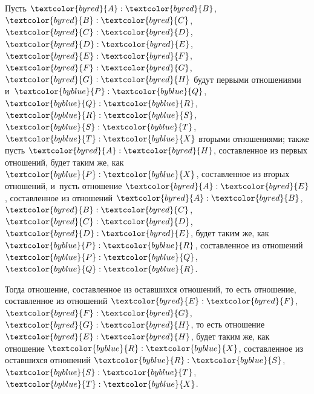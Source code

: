 \documentclass[letters,booklanguage=russian]{byrnebook}
\begin{document}
\vfill\pagebreak

\label{prop:V.H}
\def\varA{\textcolor{byred}{A}}
\def\varB{\textcolor{byred}{B}}
\def\varC{\textcolor{byred}{C}}
\def\varD{\textcolor{byred}{D}}
\def\varE{\textcolor{byred}{E}}
\def\varF{\textcolor{byred}{F}}
\def\varG{\textcolor{byred}{G}}
\def\varH{\textcolor{byred}{H}}
\def\varP{\textcolor{byblue}{P}}
\def\varQ{\textcolor{byblue}{Q}}
\def\varR{\textcolor{byblue}{R}}
\def\varS{\textcolor{byblue}{S}}
\def\varT{\textcolor{byblue}{T}}
\def\varX{\textcolor{byblue}{X}}

\marginpar{
~\hfill\fbox{\parbox{0.5\marginparwidth}{\centering
~$\varA\ \varB\ \varC\ \varD\ \varE\ \varF\ \varG\ \varH$~\\
~$\varP\ \varQ\ \varR\ \varS\ \varT\ \varX$~\\
}}\hfill~}
Пусть $\varA : \varB$, $\varB : \varC$, $\varC : \varD$, $\varD : \varE$, $\varE : \varF$, $\varF : \varG$, $\varG : \varH$ будут первыми отношениями и~$\varP : \varQ$, $\varQ : \varR$, $\varR : \varS$, $\varS : \varT$, $\varT : \varX$ вторыми отношениями; также пусть $\varA : \varH$, составленное из первых отношений, будет таким же, как $\varP : \varX$, составленное из вторых отношений, и~пусть отношение $\varA : \varE$, составленное из отношений $\varA : \varB$, $\varB : \varC$, $\varC : \varD$, $\varD : \varE$, будет таким же, как $\varP : \varR$, составленное из отношений $\varP : \varQ$, $\varQ : \varR$.

Тогда отношение, составленное из оставшихся отношений, то есть отношение, составленное из отношений $\varE : \varF$, $\varF : \varG$, $\varG : \varH$, то есть отношение $\varE : \varH$, будет таким же, как отношение $\varR : \varX$, составленное из оставшихся отношений $\varR : \varS$, $\varS : \varT$, $\varT : \varX$.
\end{document}

